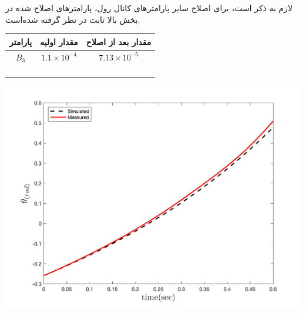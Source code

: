 

لازم به ذکر است، برای اصلاح سایر پارامترهای کانال رول، پارامترهای اصلاح شده در بخش بالا ثابت در نظر گرفته شده‌است.



\begin{minipage}[H]{\linewidth}
	\hfill
	\begin{minipage}[b]{0.49\linewidth}
		\centering
		\begin{tabular}{ccc}\hline
			پارامتر & مقدار اولیه  & مقدار بعد از اصلاح
			\\ \hline
			$B_3$  & $1.1\times10^{-4}$ & $7.13\times10^{-5}$ \\ \hline
			\\
			\\\\\\
		\end{tabular}
	\captionsetup{justification=centering}
	\end{minipage}
	\begin{minipage}[b]{0.48\linewidth}
		\centering
		\includegraphics[width=1\linewidth]{../Figures/RCP/pitch_parameter_estimation/RCP_pitch_S1.png}
		\captionsetup{justification=centering}
	\end{minipage}
\end{minipage}



